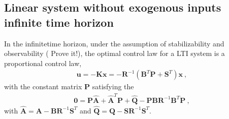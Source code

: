 \documentclass[letterpaper,10pt,english]{jupyterBook}
\begin{document}
\subsection{Linear system without exogenous inputs \sphinxhyphen{} infinite time horizon}
\label{\detokenize{ch/control/optimal-control-full-state-linear-infinite-time:linear-system-without-exogenous-inputs-infinite-time-horizon}}\label{\detokenize{ch/control/optimal-control-full-state-linear-infinite-time:control-optimal-full-state-fb-linear-infinite-time-horizon}}\label{\detokenize{ch/control/optimal-control-full-state-linear-infinite-time::doc}}
\sphinxAtStartPar
In the infinite\sphinxhyphen{}time horizon, under the assumption of stabilizability and observability ( Prove it!), the optimal control law for a LTI system is a proportional control law,
\begin{equation*}
\begin{split}\mathbf{u} = - \mathbf{K} \mathbf{x} = - \mathbf{R}^{-1} ( \mathbf{B}^T \mathbf{P} + \mathbf{S}^T ) \mathbf{x} \ ,\end{split}
\end{equation*}
\sphinxAtStartPar
with the constant matrix \(\mathbf{P}\) satisfying the 
\begin{equation}\label{equation:ch/control/optimal-control-full-state-linear-infinite-time:eq:optimal:infinite-time:p-are}
\begin{split}\mathbf{0} = \mathbf{P} \hat{\mathbf{A}} + \hat{\mathbf{A}}^T \mathbf{P} + \hat{\mathbf{Q}} - \mathbf{P} \mathbf{B} \mathbf{R}^{-1} \mathbf{B}^T \mathbf{P} \ ,\end{split}
\end{equation}
\sphinxAtStartPar
with \(\hat{\mathbf{A}} = \mathbf{A} - \mathbf{B} \mathbf{R}^{-1} \mathbf{S}^T\) and \(\hat{\mathbf{Q}} = \mathbf{Q} - \mathbf{S} \mathbf{R}^{-1} \mathbf{S}^T\).
\end{document}
